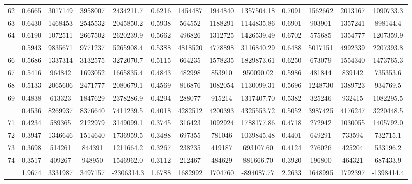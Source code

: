 \documentclass[
  12pt,
]{article}
\begin{document}
\begin{longtable}[t]{lcccccccccccc}
62 & 0.6665 & 3017149 & 3958007 & 2434211.7 & 0.6216 & 1454487 & 1944840 & 1357504.18 & 0.7091 & 1562662 & 2013167 & 1090733.3\\
63 & 0.6430 & 1468453 & 2545532 & 2045850.2 & 0.5938 & 564552 & 1188291 & 1144835.86 & 0.6901 & 903901 & 1357241 & 898144.4\\
64 & 0.6190 & 1072511 & 2667502 & 2620239.9 & 0.5662 & 496826 & 1312725 & 1426539.49 & 0.6702 & 575685 & 1354777 & 1207359.9\\
\addlinespace
65 & 0.5943 & 9835671 & 9771237 & 5265908.4 & 0.5388 & 4818520 & 4778898 & 3116840.29 & 0.6488 & 5017151 & 4992339 & 2207393.8\\
66 & 0.5686 & 1337314 & 3132575 & 3272070.7 & 0.5115 & 664235 & 1578235 & 1829873.61 & 0.6250 & 673079 & 1554340 & 1473765.3\\
67 & 0.5416 & 964842 & 1693052 & 1665835.4 & 0.4843 & 482998 & 853910 & 950090.02 & 0.5986 & 481844 & 839142 & 735353.6\\
68 & 0.5133 & 2065606 & 2471777 & 2080679.1 & 0.4569 & 816876 & 1082054 & 1130099.31 & 0.5696 & 1248730 & 1389723 & 934769.5\\
69 & 0.4838 & 613323 & 1847629 & 2378286.9 & 0.4294 & 288077 & 915214 & 1317407.70 & 0.5382 & 325246 & 932415 & 1082295.5\\
\addlinespace
70 & 0.4536 & 8269937 & 8376640 & 7411239.5 & 0.4018 & 4282512 & 4200393 & 4325553.72 & 0.5052 & 3987425 & 4176247 & 3220448.5\\
71 & 0.4234 & 589365 & 2122979 & 3149099.1 & 0.3745 & 316423 & 1092924 & 1788177.86 & 0.4718 & 272942 & 1030055 & 1405792.0\\
72 & 0.3947 & 1346646 & 1514640 & 1736959.5 & 0.3488 & 697355 & 781046 & 1039845.48 & 0.4401 & 649291 & 733594 & 732715.1\\
73 & 0.3698 & 514261 & 844391 & 1211664.2 & 0.3267 & 238235 & 419187 & 693107.60 & 0.4124 & 276026 & 425204 & 533196.2\\
74 & 0.3517 & 409267 & 948950 & 1546962.0 & 0.3112 & 212467 & 484629 & 881666.70 & 0.3920 & 196800 & 464321 & 687433.9\\
\addlinespace
75 & 1.9674 & 3331987 & 3497157 & -2306314.3 & 1.6788 & 1682992 & 1704760 & -894087.77 & 2.2633 & 1648995 & 1792397 & -1398414.4\\*
\end{longtable}
\endgroup{}

\begingroup\fontsize{9.7}{11.7}\selectfont
\end{document}
